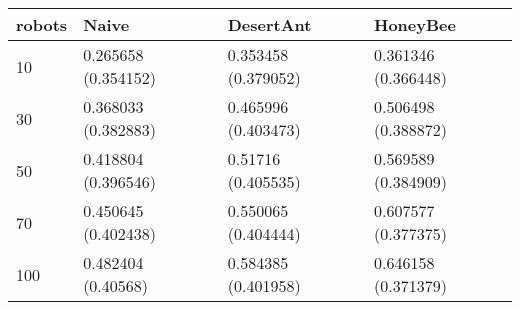 \begin{tabular} {|l|l|l|l|}
\hline
robots & Naive & DesertAnt & HoneyBee \\
\hline
10 & 0.265658 (0.354152)  & 0.353458 (0.379052)  & 0.361346 (0.366448)  \\
30 & 0.368033 (0.382883)  & 0.465996 (0.403473)  & 0.506498 (0.388872)  \\
50 & 0.418804 (0.396546)  & 0.51716 (0.405535)  & 0.569589 (0.384909)  \\
70 & 0.450645 (0.402438)  & 0.550065 (0.404444)  & 0.607577 (0.377375)  \\
100 & 0.482404 (0.40568)  & 0.584385 (0.401958)  & 0.646158 (0.371379)  \\
\hline
\end{tabular}
